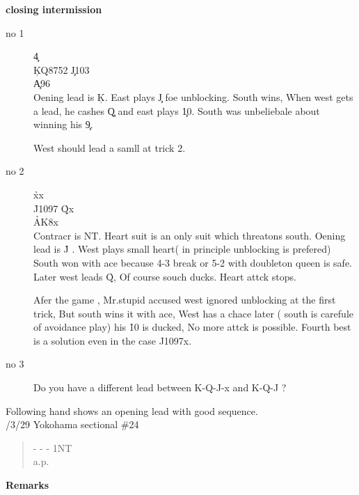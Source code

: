 \vspace{0.5cm}
{\bf closing intermission}\\
\begin{description}
\item[no 1]{
\qquad \qquad \qquad \c 4\\
\qquad \c KQ8752 \qquad \qquad \c J103\\
\qquad \qquad \qquad \c A96\\

Oening lead is \c K. East plays \c J foe 
unblocking. South wins, When west gets a lead,
he cashes \c Q and east plays \c 10. South was
unbeliebale about winning his \c 9.

West should lead a samll at trick 2.
}
\item[no 2]{


\qquad \qquad \qquad \h xx\\
\qquad \h J1097 \qquad \qquad \h Qx\\
\qquad \qquad \qquad \h AK8x\\

Contracr is NT.
Heart suit is an only suit which threatons south.
Oening lead is \h J . West plays small heart( in
principle unblocking is prefered)
South won with ace because 4-3 break  or 5-2 with  doubleton
queen is safe. Later west leads \h Q, Of course souch ducks.
Heart attck stops.

Afer the game , Mr.stupid accused west ignored
unblocking at the first trick, But south wins it with ace,
West has a chace later ( south is carefule of avoidance play)
his \h 10 is ducked, No more attck is possible.
Fourth best is a solution even in the case J1097x.  
}
\item[no 3]{
Do you have a different lead between
K-Q-J-x and K-Q-J ?

}
\end{description}
\vspace{0.5cm}

Following hand shows an opening lead with good sequence.\\

/3/29 Yokohama sectional \#24
\begin{quote}
%
  {}%
  {}
  {}%
  {}%
\end{quote}
\begin{quote}
\begin{bidding}
- \> -  \> - \> 1NT  \\
a.p.
\end{bidding}
\end{quote}
{\bf Remarks}\\

